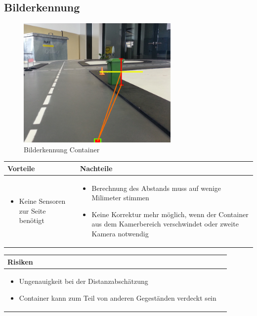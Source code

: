 \subsection{Bilderkennung}
\begin{figure}[h!]%
\centering
\includegraphics[width=0.7\textwidth]{fig/containererkennung_detailliert_bilderkennung.png}
\caption{Bilderkennung Container}
\label{fig:Bilderkennung Container}
\end{figure}
\begin{table}[h]
\begin{tabular}{p{} | p{}}


 \textbf{Vorteile} & \textbf{Nachteile} \\ \hline
	 
\begin{itemize}
\item Keine Sensoren zur Seite benötigt
\end{itemize}

 
 &
 
\begin{itemize}
\item Berechnung des Abstands muss auf wenige Milimeter stimmen
\item Keine Korrektur mehr möglich, wenn der Container aus dem Kamerbereich verschwindet oder zweite Kamera notwendig
\end{itemize}

\end{tabular}
\end{table}

\begin{table}[h]
\begin{tabular}{p{}p{}}


 \textbf{Risiken} & \\ \hline
	 
\begin{itemize}
\item Ungenauigkeit bei der Distanzabschätzung
\item Container kann zum Teil von anderen Gegeständen verdeckt sein
\end{itemize}

 
\end{tabular}
\end{table}

\pagebreak
